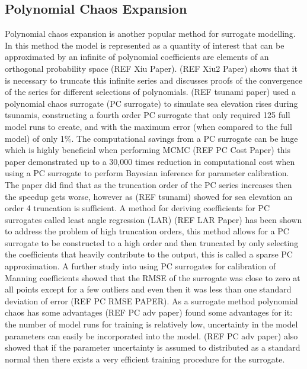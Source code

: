 \documentclass[12pt,a4paper]{article}
\begin{document}
\subsection{Polynomial Chaos Expansion}
\noindent
Polynomial chaos expansion is another popular method for surrogate modelling. In this method the model is represented as a quantity of interest that can be approximated by an infinite of polynomial coefficients are elements of an orthogonal probability space (REF Xiu Paper). (REF Xiu2 Paper) shows that it is necessary to truncate this infinite series and discusses proofs of the convergence of the series for different selections of polynomials. (REF tsunami paper) used a polynomial chaos surrogate (PC surrogate) to simulate sea elevation rises during tsunamis, constructing a fourth order PC surrogate that only required 125 full model runs to create, and with the maximum error (when compared to the full model) of only 1\%. The computational savings from a PC surrogate can be huge which is highly beneficial when performing MCMC (REF PC Cost Paper) this paper demonstrated up to a 30,000 times reduction in computational cost when using a PC surrogate to perform Bayesian inference for parameter calibration. The paper did find that as the truncation order of the PC series increases then the speedup gets worse, however as (REF tsunami) showed for sea elevation an order 4 truncation is sufficient. A method for deriving coefficients for PC surrogates called least angle regression (LAR) (REF LAR Paper) has been shown to address the problem of high truncation orders, this method allows for a PC surrogate to be constructed to a high order and then truncated by only selecting the coefficients that heavily contribute to the output, this is called a sparse PC approximation. A further study into using PC surrogates for calibration of Manning coefficients showed that the RMSE of the surrogate was close to zero at all points except for a few outliers and even then it was less than one standard deviation of error (REF PC RMSE PAPER). As a surrogate method polynomial chaos has some advantages (REF PC adv paper) found some advantages for it: the number of model runs for training is relatively low, uncertainty in the model parameters can easily be incorporated into the model. (REF PC adv paper) also showed that if the parameter uncertainty is assumed to distributed as a standard normal then there exists a very efficient training procedure for the surrogate. 
\end{document}
